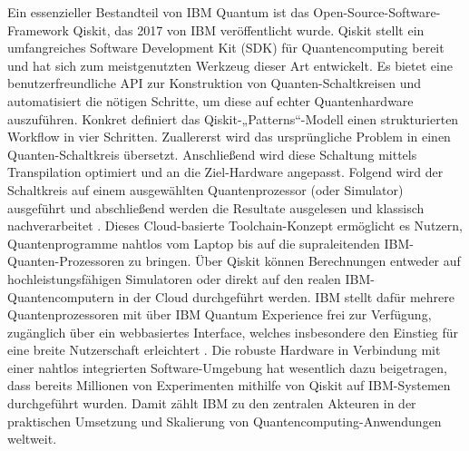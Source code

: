 Ein essenzieller Bestandteil von IBM Quantum ist das Open-Source-Software-Framework Qiskit, das 2017 von IBM veröffentlicht wurde. Qiskit stellt ein umfangreiches Software Development Kit (SDK) für Quantencomputing bereit und hat sich zum meistgenutzten Werkzeug dieser Art entwickelt. Es bietet eine benutzerfreundliche API zur Konstruktion von Quanten-Schaltkreisen und automatisiert die nötigen Schritte, um diese auf echter Quantenhardware auszuführen. Konkret definiert das Qiskit-„Patterns“-Modell einen strukturierten Workflow in vier Schritten. Zuallererst wird das ursprüngliche Problem in einen Quanten-Schaltkreis übersetzt. Anschließend wird diese Schaltung mittels Transpilation optimiert und an die Ziel-Hardware angepasst. Folgend wird der Schaltkreis auf einem ausgewählten Quantenprozessor (oder Simulator) ausgeführt und abschließend werden die Resultate ausgelesen und klassisch nachverarbeitet \citealp[7]{abughanemIBMQuantumComputers2025}. Dieses Cloud-basierte Toolchain-Konzept ermöglicht es Nutzern, Quantenprogramme nahtlos vom Laptop bis auf die supraleitenden IBM-Quanten-Prozessoren zu bringen. Über Qiskit können Berechnungen entweder auf hochleistungsfähigen Simulatoren oder direkt auf den realen IBM-Quantencomputern in der Cloud durchgeführt werden. IBM stellt dafür mehrere Quantenprozessoren mit über IBM Quantum Experience frei zur Verfügung, zugänglich über ein webbasiertes Interface, welches insbesondere den Einstieg für eine breite Nutzerschaft erleichtert \citealp[5]{wangAdvantagesTwoQuantum2025}. Die robuste Hardware in Verbindung mit einer nahtlos integrierten Software-Umgebung hat wesentlich dazu beigetragen, dass bereits Millionen von Experimenten mithilfe von Qiskit auf IBM-Systemen durchgeführt wurden. Damit zählt IBM zu den zentralen Akteuren in der praktischen Umsetzung und Skalierung von Quantencomputing-Anwendungen weltweit.

